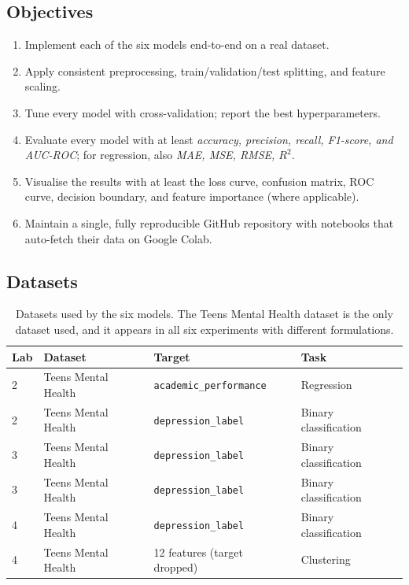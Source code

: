 \documentclass[11pt,a4paper]{article}
\begin{document}
\subsection{Objectives}

\begin{enumerate}[leftmargin=*, itemsep=2pt]
    \item Implement each of the six models end-to-end on a real dataset.
    \item Apply consistent preprocessing, train/validation/test splitting, and
        feature scaling.
    \item Tune every model with cross-validation; report the best
        hyperparameters.
    \item Evaluate every model with at least \emph{accuracy, precision, recall,
        F1-score, and AUC-ROC}; for regression, also \emph{MAE, MSE, RMSE, $R^2$}.
    \item Visualise the results with at least the loss curve, confusion matrix,
        ROC curve, decision boundary, and feature importance (where applicable).
    \item Maintain a single, fully reproducible GitHub repository with notebooks
        that auto-fetch their data on Google Colab.
\end{enumerate}

\subsection{Datasets}

\begin{table}[H]
    \centering
    \begin{tabularx}{\linewidth}{lXlX}
        \toprule
        \textbf{Lab} & \textbf{Dataset} & \textbf{Target} & \textbf{Task} \\
        \midrule
        2 & Teens Mental Health & \texttt{academic\_performance} & Regression \\
        2 & Teens Mental Health & \texttt{depression\_label}     & Binary classification \\
        3 & Teens Mental Health & \texttt{depression\_label}     & Binary classification \\
        3 & Teens Mental Health & \texttt{depression\_label}     & Binary classification \\
        4 & Teens Mental Health & \texttt{depression\_label}     & Binary classification \\
        4 & Teens Mental Health & 12 features (target dropped)   & Clustering \\
        \bottomrule
    \end{tabularx}
    \caption{Datasets used by the six models. The Teens Mental Health
    dataset is the only dataset used, and it appears in all six experiments
    with different formulations.}
    \label{tab:datasets}
\end{table}
\end{document}
